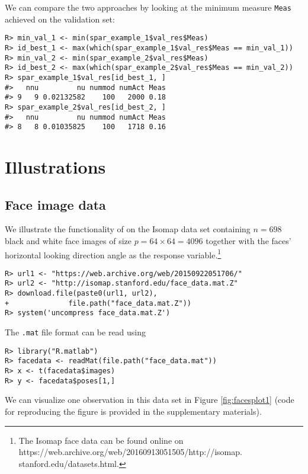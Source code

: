 \documentclass[
  article]{jss}
\begin{document}
We can compare the two approaches by looking at the minimum measure
\texttt{Meas} achieved on the validation set:

\begin{verbatim}
R> min_val_1 <- min(spar_example_1$val_res$Meas)
R> id_best_1 <- max(which(spar_example_1$val_res$Meas == min_val_1))
R> min_val_2 <- min(spar_example_2$val_res$Meas)
R> id_best_2 <- max(which(spar_example_2$val_res$Meas == min_val_2))
R> spar_example_1$val_res[id_best_1, ]
#>   nnu         nu nummod numAct Meas
#> 9   9 0.02132582    100   2000 0.18
R> spar_example_2$val_res[id_best_2, ]
#>   nnu         nu nummod numAct Meas
#> 8   8 0.01035825    100   1718 0.16
\end{verbatim}

\section{Illustrations}\label{sec-illustrations}

\subsection{Face image data}\label{face-image-data}

We illustrate the functionality of  on the Isomap data set
containing \(n = 698\) black and white face images of size
\(p = 64 \times 64 = 4096\) together with the faces' horizontal looking
direction angle as the response variable.\footnote{
The Isomap face data can be found online on https://web.archive.org/web/20160913051505/http://isomap.
stanford.edu/datasets.html.}

\begin{verbatim}
R> url1 <- "https://web.archive.org/web/20150922051706/"
R> url2 <- "http://isomap.stanford.edu/face_data.mat.Z"
R> download.file(paste0(url1, url2),
+              file.path("face_data.mat.Z"))
R> system('uncompress face_data.mat.Z')
\end{verbatim}

The \texttt{.mat} file format can be read using 
\citep{pkg:rmatlab}

\begin{verbatim}
R> library("R.matlab")
R> facedata <- readMat(file.path("face_data.mat"))
R> x <- t(facedata$images)
R> y <- facedata$poses[1,]
\end{verbatim}

We can visualize one observation in this data set in Figure
\ref{fig:facesplot1} (code for reproducing the figure is provided in the
supplementary materials).
\end{document}
